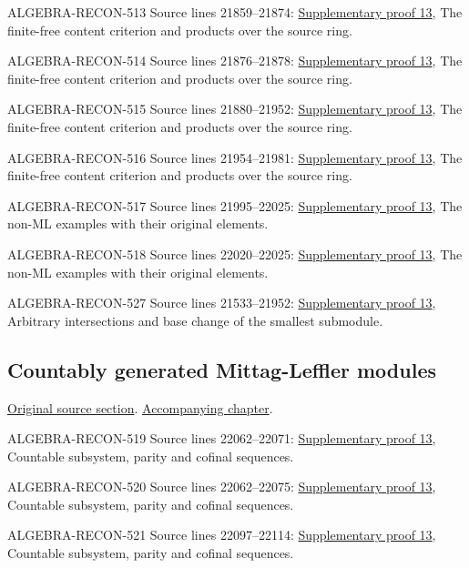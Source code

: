 \begin{AlgebraSourceRoutes}
\item[ALGEBRA-RECON-513] Source lines 21859--21874: \hyperlink{algebra_ml_coherent_notes_20260927}{Supplementary proof 13}, The finite-free content criterion and products over the source ring.
\item[ALGEBRA-RECON-514] Source lines 21876--21878: \hyperlink{algebra_ml_coherent_notes_20260927}{Supplementary proof 13}, The finite-free content criterion and products over the source ring.
\item[ALGEBRA-RECON-515] Source lines 21880--21952: \hyperlink{algebra_ml_coherent_notes_20260927}{Supplementary proof 13}, The finite-free content criterion and products over the source ring.
\item[ALGEBRA-RECON-516] Source lines 21954--21981: \hyperlink{algebra_ml_coherent_notes_20260927}{Supplementary proof 13}, The finite-free content criterion and products over the source ring.
\item[ALGEBRA-RECON-517] Source lines 21995--22025: \hyperlink{algebra_ml_coherent_notes_20260927}{Supplementary proof 13}, The non-ML examples with their original elements.
\item[ALGEBRA-RECON-518] Source lines 22020--22025: \hyperlink{algebra_ml_coherent_notes_20260927}{Supplementary proof 13}, The non-ML examples with their original elements.
\item[ALGEBRA-RECON-527] Source lines 21533--21952: \hyperlink{algebra_ml_coherent_notes_20260927}{Supplementary proof 13}, Arbitrary intersections and base change of the smallest submodule.
\end{AlgebraSourceRoutes}

\subsection{Countably generated Mittag-Leffler modules}
\hypertarget{algebra-source-section-ML-countable}{}
\noindent\href{https://github.com/stacks/stacks-project/blob/a04446e57ec1fbc252a871afcec7752fb2807b14/algebra.tex\#L22045}{Original source section}. \href{algebra.pdf\#nameddest=section-ML-countable}{Accompanying chapter}.

\begin{AlgebraSourceRoutes}
\item[ALGEBRA-RECON-519] Source lines 22062--22071: \hyperlink{algebra_ml_coherent_notes_20260927}{Supplementary proof 13}, Countable subsystem, parity and cofinal sequences.
\item[ALGEBRA-RECON-520] Source lines 22062--22075: \hyperlink{algebra_ml_coherent_notes_20260927}{Supplementary proof 13}, Countable subsystem, parity and cofinal sequences.
\item[ALGEBRA-RECON-521] Source lines 22097--22114: \hyperlink{algebra_ml_coherent_notes_20260927}{Supplementary proof 13}, Countable subsystem, parity and cofinal sequences.
\end{AlgebraSourceRoutes}

